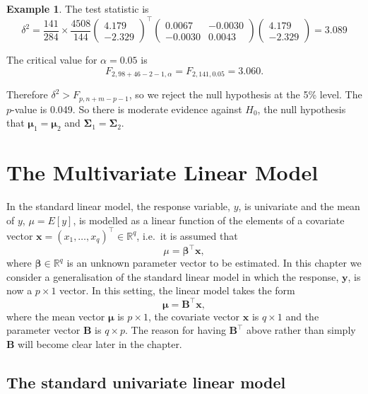 \documentclass[]{book}
\theoremstyle{definition}
\theoremstyle{definition}
\newtheorem{example}{Example}[chapter]
\theoremstyle{definition}
\theoremstyle{remark}
\begin{document}
\begin{example}
The test statistic is
\[\delta^2 = \frac{141}{284} \times \frac{4508}{144} \begin{pmatrix} 4.179 \\ -2.329 \end{pmatrix}^\top \begin{pmatrix} 0.0067 & -0.0030 \\ -0.0030 & 0.0043 \end{pmatrix} \begin{pmatrix} 4.179 \\ -2.329 \end{pmatrix}
= 3.089\]

The critical value for \(\alpha=0.05\) is
\[F_{2,98+46-2-1,\alpha} = F_{2,141,0.05} = 3.060.\]

Therefore \(\delta^2 > F_{p,n+m-p-1}\), so we reject the null hypothesis at the 5\% level. The \(p\)-value is 0.049. So there is moderate evidence against \(H_0\), the null hypothesis that \(\boldsymbol \mu_1=\boldsymbol \mu_2\) and \(\boldsymbol \Sigma_1=\boldsymbol \Sigma_2\).
\end{example}

\hypertarget{the-multivariate-linear-model}{%
\chapter{The Multivariate Linear Model}\label{the-multivariate-linear-model}}

In the standard linear model, the response variable, \(y\), is univariate and the mean of \(y\), \(\mu=E[y]\), is modelled as a linear function of the elements of a covariate vector \(\boldsymbol x=(x_1, \ldots , x_q)^\top \in \mathbb{R}^q\), i.e.~it is assumed that
\[
\mu = \boldsymbol \beta^\top \boldsymbol x,
\]
where \(\boldsymbol \beta\in \mathbb{R}^q\) is an unknown parameter vector to be estimated. In this chapter we consider a generalisation of the standard linear model in which the response, \(\boldsymbol y\), is now a \(p \times 1\) vector. In this setting, the linear model takes the form
\[
{\pmb \mu}=\boldsymbol B^\top \boldsymbol x,
\]
where the mean vector \(\boldsymbol \mu\) is \(p \times 1\), the covariate vector \(\boldsymbol x\) is \(q \times 1\) and the parameter vector \(\boldsymbol B\) is \(q \times p\). The reason for having \(\boldsymbol B^\top\) above rather than simply \(\boldsymbol B\) will become clear later in the chapter.

\hypertarget{the-standard-univariate-linear-model}{%
\section{The standard univariate linear model}\label{the-standard-univariate-linear-model}}
\end{document}
